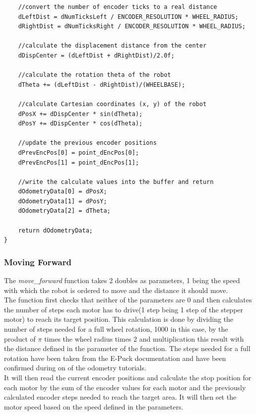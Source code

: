 \documentclass[10pt,a4paper]{article}
\begin{document}
\begin{flushleft}
\begin{lstlisting}
	//convert the number of encoder ticks to a real distance
	dLeftDist = dNumTicksLeft / ENCODER_RESOLUTION * WHEEL_RADIUS;
	dRightDist = dNumTicksRight / ENCODER_RESOLUTION * WHEEL_RADIUS;
	
	//calculate the displacement distance from the center 
	dDispCenter = (dLeftDist + dRightDist)/2.0f;
	
	//calculate the rotation theta of the robot
	dTheta += (dLeftDist - dRightDist)/(WHEELBASE);
	
	//calculate Cartesian coordinates (x, y) of the robot
	dPosX += dDispCenter * sin(dTheta);
	dPosY += dDispCenter * cos(dTheta); 
	
	//update the previous encoder positions
	dPrevEncPos[0] = point_dEncPos[0];
	dPrevEncPos[1] = point_dEncPos[1];
	
	//write the calculate values into the buffer and return
	dOdometryData[0] = dPosX;
	dOdometryData[1] = dPosY;
	dOdometryData[2] = dTheta;
	
	return dOdometryData;
}
\end{lstlisting}

\subsubsection{Moving Forward}
The \textit{move\_forward }function takes 2 doubles as parameters, 1 being the speed with which the robot is ordered to move and the distance it should move.\\
The function first checks that neither of the parameters are 0 and then calculates the number of steps each motor has to drive(1 step being 1 step of the stepper motor) to reach its target position.
This calculation is done by dividing the number of steps needed for a full wheel rotation, 1000 in this case, by the product of $\pi$ times the wheel radius times 2 and multiplication this result with the distance defined in the parameter of the function. The steps needed for a full rotation have been taken from the E-Puck documentation and have been confirmed during on of the odometry tutorials. \\
It will then read the current encoder positions and calculate the stop position for each motor by the sum of the encoder values for each motor and the previously calculated encoder steps needed to reach the target area. 
It will then set the motor speed based on the speed defined in the parameters.\\[3ex]


\end{flushleft}
\end{document}
